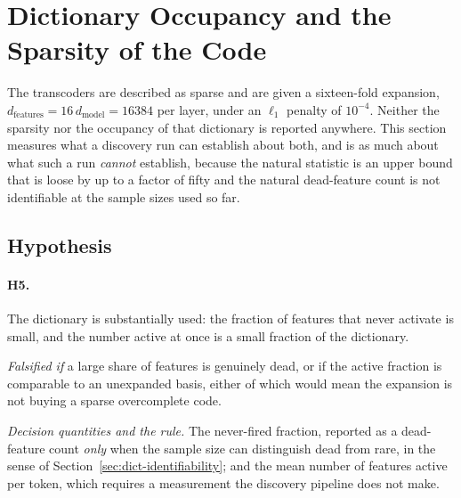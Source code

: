 
\providecommand{\RESULT}[1]{\textbf{[#1]}}

\section{Dictionary Occupancy and the Sparsity of the Code}
\label{sec:dictionary}

The transcoders are described as sparse and are given a sixteen-fold expansion,
$d_{\mathrm{features}} = 16\,d_{\mathrm{model}} = 16384$ per layer, under an
$\ell_1$ penalty of $10^{-4}$. Neither the sparsity nor the occupancy of that
dictionary is reported anywhere. This section measures what a discovery run can
establish about both, and is as much about what such a run \emph{cannot}
establish, because the natural statistic is an upper bound that is loose by up
to a factor of fifty and the natural dead-feature count is not identifiable at
the sample sizes used so far.

\subsection{Hypothesis}

\paragraph{H5.} The dictionary is substantially used: the fraction of features
that never activate is small, and the number active at once is a small fraction
of the dictionary.

\emph{Falsified if} a large share of features is genuinely dead, or if the
active fraction is comparable to an unexpanded basis, either of which would mean
the expansion is not buying a sparse overcomplete code.

\emph{Decision quantities and the rule.} The never-fired fraction, reported as a
dead-feature count \emph{only} when the sample size can distinguish dead from
rare, in the sense of Section~\ref{sec:dict-identifiability}; and the mean
number of features active per token, which requires a measurement the discovery
pipeline does not make.

